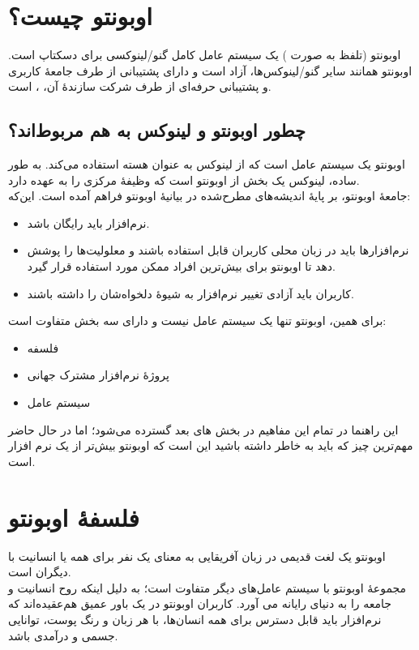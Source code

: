 \section{اوبونتو چیست؟}
اوبونتو (تلفظ به صورت ) یک سیستم عامل کامل گنو/لینوکسی برای دسکتاپ است. اوبونتو همانند سایر گنو/لینوکس‌ها، آزاد است و دارای پشتیبانی از طرف جامعهٔ کاربری و پشتیبانی حرفه‌ای از طرف شرکت سازندهٔ آن، ، است.\\
\subsection{چطور اوبونتو  و لینوکس به هم مربوط‌اند؟}
اوبونتو یک سیستم عامل است که از لینوکس به عنوان هسته استفاده می‌کند. به طور ساده، لینوکس یک بخش از اوبونتو  است که وظیفهٔ مرکزی را به عهده دارد.\\

جامعهٔ اوبونتو، بر پایهٔ اندیشه‌های مطرح‌شده در بیانیهٔ اوبونتو فراهم آمده است. این‌که:

\begin{itemize}
\item نرم‌افزار باید رایگان باشد.
\item نرم‌افزارها باید در زبان محلی کاربران قابل استفاده باشند و معلولیت‌ها را پوشش دهد تا اوبونتو برای بیش‌ترین افراد ممکن مورد استفاده قرار گیرد.
\item کاربران باید آزادی تغییر نرم‌افزار به شیوهٔ دلخواه‌شان را داشته باشند.\\
\end{itemize}

برای همین، اوبونتو تنها یک سیستم عامل نیست و دارای سه بخش متفاوت است:

\begin{itemize}
\item فلسفه
\item پروژهٔ نرم‌افزار مشترک جهانی
\item سیستم عامل
\end{itemize}

این راهنما در تمام این مفاهیم در بخش های بعد گسترده می‌شود؛ اما در حال حاضر مهم‌ترین چیز که باید به خاطر داشته باشید این است که اوبونتو بیش‌تر از یک نرم افزار است.

\section{فلسفهٔ اوبونتو}
اوبونتو یک لغت قدیمی در زبان آفریقایی به معنای یک نفر برای همه یا انسانیت با دیگران است.\\
مجموعهٔ اوبونتو با سیستم عامل‌های دیگر متفاوت است؛ به دلیل اینکه روح انسانیت و جامعه را به دنیای رایانه می آورد. کاربران اوبونتو در یک باور عمیق هم‌عقیده‌اند که نرم‌افزار باید قابل دسترس برای همه انسان‌ها، با هر زبان و رنگ پوست، توانایی جسمی و درآمدی باشد.

